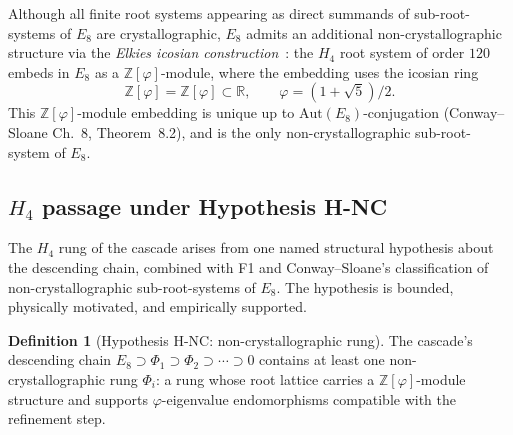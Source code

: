 \documentclass[12pt]{article}
\theoremstyle{definition}
\newtheorem{definition}[theorem]{Definition}
\theoremstyle{remark}
\newcommand{\Zphi}{\mathbb{Z}[\varphi]}
\begin{document}
Although all finite root systems appearing as direct summands of sub-root-systems of $E_8$ are crystallographic, $E_8$ admits an additional non-crystallographic structure via the \emph{Elkies icosian construction}~\citep{ConwaySloane1999}: the $H_4$ root system of order $120$ embeds in $E_8$ as a $\Zphi$-module, where the embedding uses the icosian ring
\begin{equation}\label{eq:elkies-icosian}
\Zphi = \mathbb{Z}[\varphi] \subset \mathbb{R}, \qquad \varphi = (1 + \sqrt{5})/2.
\end{equation}
This $\Zphi$-module embedding is unique up to $\mathrm{Aut}(E_8)$-conjugation (Conway--Sloane Ch.~8, Theorem~8.2), and is the only non-crystallographic sub-root-system of $E_8$.

\subsection{$H_4$ passage under Hypothesis H-NC}\label{sec:F3-h4-passage}

The $H_4$ rung of the cascade arises from one named structural hypothesis about the descending chain, combined with F1 and Conway--Sloane's classification of non-crystallographic sub-root-systems of $E_8$. The hypothesis is bounded, physically motivated, and empirically supported.

\begin{definition}[Hypothesis H-NC: non-crystallographic rung]\label{hyp:NC}
The cascade's descending chain $E_8 \supset \Phi_1 \supset \Phi_2 \supset \cdots \supset 0$ contains at least one non-crystallographic rung $\Phi_i$: a rung whose root lattice carries a $\Zphi$-module structure and supports $\varphi$-eigenvalue endomorphisms compatible with the refinement step.
\end{definition}
\end{document}
